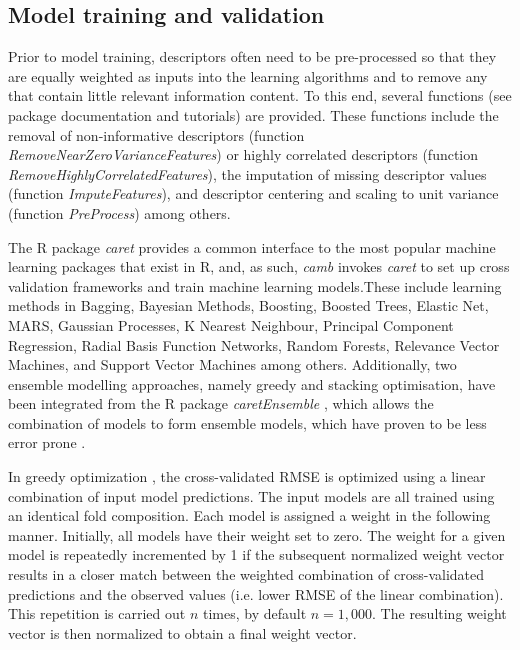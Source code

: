 \documentclass[twoside,a4wide,10pt]{article}
\begin{document}
\subsection{Model training and validation}

Prior to model training, descriptors often need to be pre-processed \citep{andersson} so that they are equally weighted as inputs into the learning algorithms and to remove any that contain little relevant information content.
To this end, several functions (see package documentation and tutorials)
are provided.
These functions include the removal of non-informative descriptors (function {\it RemoveNearZeroVarianceFeatures})
or highly correlated descriptors (function {\it RemoveHighlyCorrelatedFeatures}),
the imputation of missing descriptor values (function {\it ImputeFeatures}),
and descriptor centering and scaling to unit variance (function {\it PreProcess}) among others.

The R package {\it caret} provides a common interface to the most popular machine learning packages that exist in R, and, as such,
{\it camb} invokes {\it caret} to set up cross validation frameworks and
train machine learning models.These include learning methods in Bagging, Bayesian Methods, Boosting, Boosted Trees, Elastic Net, MARS, Gaussian Processes, K Nearest Neighbour, Principal Component Regression, Radial Basis Function Networks, Random Forests, Relevance Vector Machines, and Support Vector Machines among others.
Additionally, two ensemble modelling approaches, namely greedy and stacking optimisation,
have been integrated from the R package {\it caretEnsemble} \citep{caretEnsemble},
which allows the combination of models to form ensemble models, which have proven to be less error prone \citep{cortesCOX}.

In greedy optimization \citep{caruana}, the cross-validated RMSE is optimized using a linear combination of input model predictions. 
The input models are all trained using an identical fold composition.
Each model is assigned a weight in the following manner. 
Initially, all models have their weight set to zero. 
The weight for a given model is repeatedly incremented by 1 if the subsequent normalized weight vector results in a
closer match between the weighted combination of cross-validated predictions and the observed values (i.e. lower RMSE of the linear combination). 
This repetition is carried out $n$ times, by default $n = 1,000$.
The resulting weight vector is then normalized to obtain a final weight vector.
\end{document}
